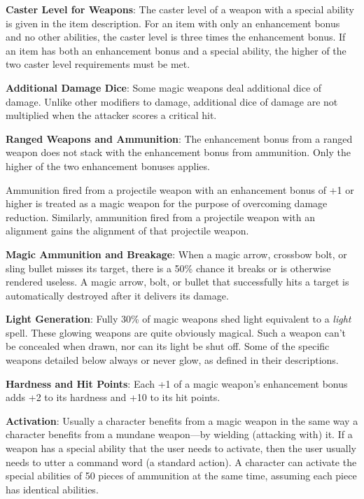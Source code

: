 \textbf{Caster Level for Weapons}: The caster level of a weapon with a special ability is given in the item description. For an item with only an enhancement bonus and no other abilities, the caster level is three times the enhancement bonus. If an item has both an enhancement bonus and a special ability, the higher of the two caster level requirements must be met.
				
\textbf{Additional Damage Dice}: Some magic weapons deal additional dice of damage. Unlike other modifiers to damage, additional dice of damage are not multiplied when the attacker scores a critical hit.
				
\textbf{Ranged Weapons and Ammunition}: The enhancement bonus from a ranged weapon does not stack with the enhancement bonus from ammunition. Only the higher of the two enhancement bonuses applies.
				
Ammunition fired from a projectile weapon with an enhancement bonus of +1 or higher is treated as a magic weapon for the purpose of overcoming damage reduction. Similarly, ammunition fired from a projectile weapon with an alignment gains the alignment of that projectile weapon.
				
\textbf{Magic Ammunition and Breakage}: When a magic arrow, crossbow bolt, or sling bullet misses its target, there is a 50\% chance it breaks or is otherwise rendered useless. A magic arrow, bolt, or bullet that successfully hits a target is automatically destroyed after it delivers its damage.
				
\textbf{Light Generation}: Fully 30\% of magic weapons shed light equivalent to a \textit{light }spell. These glowing weapons are quite obviously magical. Such a weapon can't be concealed when drawn, nor can its light be shut off. Some of the specific weapons detailed below always or never glow, as defined in their descriptions.
				
\textbf{Hardness and Hit Points}: Each +1 of a magic weapon's enhancement bonus adds +2 to its hardness and +10 to its hit points.
				
\textbf{Activation}: Usually a character benefits from a magic weapon in the same way a character benefits from a mundane weapon---by wielding (attacking with) it. If a weapon has a special ability that the user needs to activate, then the user usually needs to utter a command word (a standard action). A character can activate the special abilities of 50 pieces of ammunition at the same time, assuming each piece has identical abilities.
				
